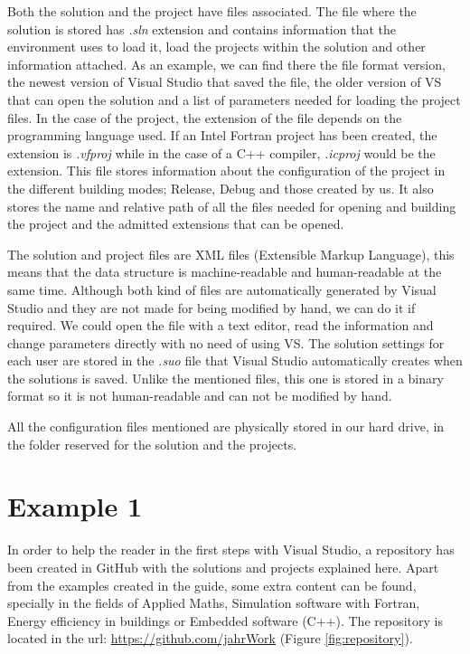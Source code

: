 Both the solution and the project have files associated. The file where the solution is stored has \textit{.sln} extension and contains information that the environment uses to load it, load the projects within the solution and other information attached. As an example, we can find there the file format version, the newest version of Visual Studio that saved the file, the older version of VS that can open the solution and a list of parameters needed for loading the project files. In the case of the project, the extension of the file depends on the programming language used. If an Intel Fortran project has been created, the extension is \textit{.vfproj} while in the case of a C++ compiler, \textit{.icproj} would be the extension. This file stores information about the configuration of the project in the different building modes; Release, Debug and those created by us. It also stores the name and relative path of all the files needed for opening and building the project and the admitted extensions that can be opened. 

The solution and project files are XML files (Extensible Markup Language), this means that the data structure is machine-readable and human-readable at the same time. Although both kind of files are automatically generated by Visual Studio and they are not made for being modified by hand, we can do it if required. We could open the file with a text editor, read the information and change parameters directly with no need of using VS. The solution settings for each user are stored in the \textit{.suo} file that Visual Studio automatically creates when the solutions is saved. Unlike the mentioned files, this one is stored in a binary format so it is not human-readable and can not be modified by hand. 

All the configuration files mentioned are physically stored in our hard drive, in the folder reserved for the solution and the projects.




\FloatBarrier
\section{Example 1} \label{sec:Ex2}

In order to help the reader in the first steps with Visual Studio, a repository has been created in GitHub with the solutions and projects explained here. Apart from the examples created in the guide, some extra content can be found, specially in the fields of Applied Maths, Simulation software with Fortran, Energy efficiency in buildings or Embedded software (C++). The repository is located in the url: \url{https://github.com/jahrWork} (Figure \ref{fig:repository}).

